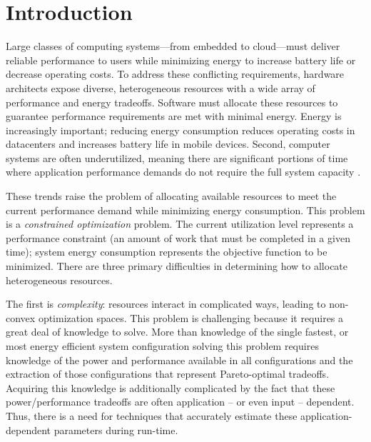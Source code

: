 \section{Introduction}

Large classes of computing systems---from embedded to cloud---must
deliver reliable performance to users while minimizing energy to
increase battery life or decrease operating costs.  To address these
conflicting requirements, hardware architects expose diverse,
heterogeneous resources with a wide array of performance and energy
tradeoffs.  Software must allocate these resources to
guarantee performance requirements are met with minimal energy. Energy is increasingly important; reducing energy consumption reduces
operating costs in datacenters and increases battery life in mobile
devices.  Second, computer systems are often underutilized, meaning
there are significant portions of time where application performance
demands do not require the full system capacity
\cite{google2007,MeisnerISCA2011}.

These trends raise the problem of allocating available resources
to meet the current performance demand while minimizing energy
consumption. This problem is a \emph{constrained optimization}
problem. The current utilization level represents a performance
constraint (\ie an amount of work that must be completed in a given
time); system energy consumption represents the objective function to
be minimized. There are three primary difficulties in determining how to allocate
heterogeneous resources.

The first is \emph{complexity}: resources
interact in complicated ways, leading to non-convex optimization
spaces. This problem is challenging because it requires a great deal of
knowledge to solve.  More than knowledge of the single fastest, or
most energy efficient system configuration solving this problem
requires knowledge of the power and performance available in all
configurations and the extraction of those configurations that
represent Pareto-optimal tradeoffs.  Acquiring this knowledge is
additionally complicated by the fact that these power/performance
tradeoffs are often application -- or even input -- dependent.  Thus,
there is a need for techniques that accurately estimate these
application-dependent parameters during run-time.

